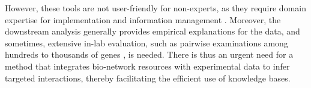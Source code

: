 However, these tools are not user-friendly for non-experts, as they require domain expertise for implementation and information management \cite{BLAST2}.
Moreover, the downstream analysis generally provides empirical explanations for the data, and sometimes, extensive in-lab evaluation, such as pairwise examinations among hundreds to thousands of genes \cite{zaman2013signaling}, is needed.
There is thus an urgent need for a method that integrates bio-network resources with experimental data to infer targeted interactions, thereby facilitating the efficient use of knowledge bases.




